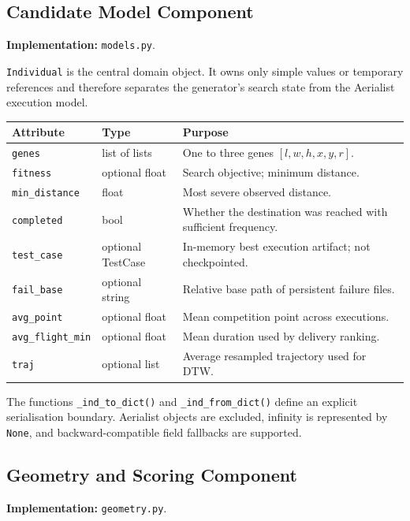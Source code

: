 \documentclass[11pt,a4paper]{report}
\newcommand{\code}[1]{\texttt{#1}}
\begin{document}
\subsection{Candidate Model Component}
\textbf{Implementation:} \code{models.py}.

\code{Individual} is the central domain object. It owns only simple values or temporary references and therefore separates the generator's search state from the Aerialist execution model.

\begin{table}[H]
\centering
\begin{tabularx}{\textwidth}{L{3.4cm} L{3.0cm} Y}
\toprule
\textbf{Attribute} & \textbf{Type} & \textbf{Purpose}\\
\midrule
\code{genes} & list of lists & One to three genes $[l,w,h,x,y,r]$.\\
\code{fitness} & optional float & Search objective; minimum distance.\\
\code{min\_distance} & float & Most severe observed distance.\\
\code{completed} & bool & Whether the destination was reached with sufficient frequency.\\
\code{test\_case} & optional TestCase & In-memory best execution artifact; not checkpointed.\\
\code{fail\_base} & optional string & Relative base path of persistent failure files.\\
\code{avg\_point} & optional float & Mean competition point across executions.\\
\code{avg\_flight\_min} & optional float & Mean duration used by delivery ranking.\\
\code{traj} & optional list & Average resampled trajectory used for DTW.\\
\bottomrule
\end{tabularx}
\end{table}

The functions \code{\_ind\_to\_dict()} and \code{\_ind\_from\_dict()} define an explicit serialisation boundary. Aerialist objects are excluded, infinity is represented by \code{None}, and backward-compatible field fallbacks are supported.

\subsection{Geometry and Scoring Component}
\textbf{Implementation:} \code{geometry.py}.
\end{document}
